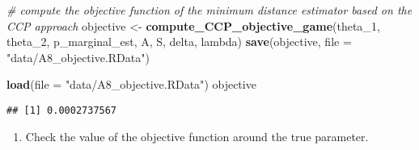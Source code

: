 \documentclass[
]{book}
\newenvironment{Shaded}{\begin{snugshade}}{\end{snugshade}}
\newcommand{\CommentTok}[1]{\textcolor[rgb]{0.56,0.35,0.01}{\textit{#1}}}
\newcommand{\DataTypeTok}[1]{\textcolor[rgb]{0.13,0.29,0.53}{#1}}
\newcommand{\DecValTok}[1]{\textcolor[rgb]{0.00,0.00,0.81}{#1}}
\newcommand{\KeywordTok}[1]{\textcolor[rgb]{0.13,0.29,0.53}{\textbf{#1}}}
\newcommand{\NormalTok}[1]{#1}
\newcommand{\StringTok}[1]{\textcolor[rgb]{0.31,0.60,0.02}{#1}}
\providecommand{\tightlist}{%
  \setlength{\itemsep}{0pt}\setlength{\parskip}{0pt}}
\begin{document}
\begin{Shaded}
\begin{Highlighting}[]
\CommentTok{# compute the objective function of the minimum distance estimator based on the CCP approach}
\NormalTok{objective <-}\StringTok{ }\KeywordTok{compute_CCP_objective_game}\NormalTok{(theta_}\DecValTok{1}\NormalTok{, theta_}\DecValTok{2}\NormalTok{, p_marginal_est, A, S, delta, lambda)}
\KeywordTok{save}\NormalTok{(objective, }\DataTypeTok{file =} \StringTok{"data/A8_objective.RData"}\NormalTok{)}
\end{Highlighting}
\end{Shaded}

\begin{Shaded}
\begin{Highlighting}[]
\KeywordTok{load}\NormalTok{(}\DataTypeTok{file =} \StringTok{"data/A8_objective.RData"}\NormalTok{)}
\NormalTok{objective}
\end{Highlighting}
\end{Shaded}

\begin{verbatim}
## [1] 0.0002737567
\end{verbatim}

\begin{enumerate}
\def\labelenumi{\arabic{enumi}.}
\setcounter{enumi}{2}
\tightlist
\item
  Check the value of the objective function around the true parameter.
\end{enumerate}
\end{document}
